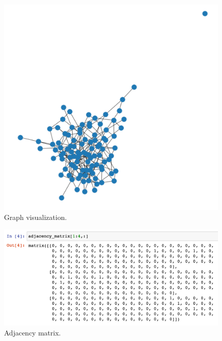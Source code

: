 \documentclass[a4paper,article,14pt]{extarticle}
\begin{document}
	\begin{figure}[h!]
		\centering
		\includegraphics[scale=0.7]{graph.png}
		\caption{Graph visualization.}
		\label{graph}
	\end{figure}


	\begin{figure}[h!]
		\centering
		\includegraphics[scale=0.35]{adjacency_matrix.png}
		\caption{Adjacency matrix.}
		\label{matrix}
	\end{figure} 
\end{document}
